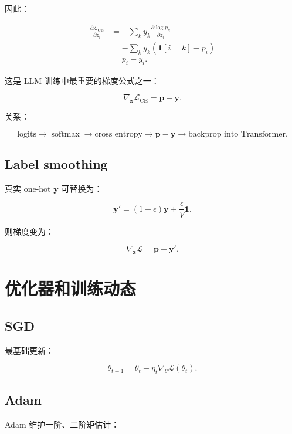 \documentclass[UTF8,12pt]{ctexart}
\newcommand{\1}{\mathbf{1}}
\newcommand{\softmax}{\operatorname{softmax}}
\begin{document}
因此：

\begin{align}
\frac{\partial \mathcal{L}_{\mathrm{CE}}}{\partial z_i}
&=-\sum_k y_k\frac{\partial \log p_k}{\partial z_i}\\
&=-\sum_k y_k(\1[i=k]-p_i)\\
&=p_i-y_i.
\label{eq:ce-gradient}
\end{align}

这是 LLM 训练中最重要的梯度公式之一：

\[
\boxed{\nabla_{\bm{z}}\mathcal{L}_{\mathrm{CE}}=\bm{p}-\bm{y}}.
\]

关系：

\[
\text{logits}
\rightarrow
\softmax
\rightarrow
\text{cross entropy}
\rightarrow
\bm{p}-\bm{y}
\rightarrow
\text{backprop into Transformer}.
\]

\subsection{Label smoothing}

真实 one-hot $\bm{y}$ 可替换为：

\begin{equation}
\bm{y}'=(1-\epsilon)\bm{y}+\frac{\epsilon}{V}\bm{1}.
\end{equation}

则梯度变为：

\begin{equation}
\nabla_{\bm{z}}\mathcal{L}=\bm{p}-\bm{y}'.
\end{equation}

\section{优化器和训练动态}

\subsection{SGD}

最基础更新：

\begin{equation}
\theta_{t+1}=\theta_t-\eta_t\nabla_\theta \mathcal{L}(\theta_t).
\end{equation}

\subsection{Adam}

Adam 维护一阶、二阶矩估计：
\end{document}

